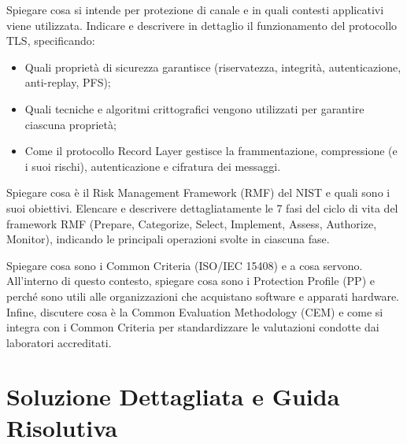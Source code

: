 \documentclass[11pt,a4paper]{article}
\begin{document}
\begin{questionbox}
Spiegare cosa si intende per protezione di canale e in quali contesti applicativi viene utilizzata.
Indicare e descrivere in dettaglio il funzionamento del protocollo TLS, specificando:
\begin{itemize}
    \item Quali propriet\`a di sicurezza garantisce (riservatezza, integrit\`a, autenticazione, anti-replay, PFS);
    \item Quali tecniche e algoritmi crittografici vengono utilizzati per garantire ciascuna propriet\`a;
    \item Come il protocollo Record Layer gestisce la frammentazione, compressione (e i suoi rischi), autenticazione e cifratura dei messaggi.
\end{itemize}
\end{questionbox}

\begin{questionbox}
Spiegare cosa \`e il Risk Management Framework (RMF) del NIST e quali sono i suoi obiettivi.
Elencare e descrivere dettagliatamente le 7 fasi del ciclo di vita del framework RMF (Prepare, Categorize, Select, Implement, Assess, Authorize, Monitor), indicando le principali operazioni svolte in ciascuna fase.
\end{questionbox}

\begin{questionbox}
Spiegare cosa sono i Common Criteria (ISO/IEC 15408) e a cosa servono.
All'interno di questo contesto, spiegare cosa sono i Protection Profile (PP) e perch\'e sono utili alle organizzazioni che acquistano software e apparati hardware.
Infine, discutere cosa \`e la Common Evaluation Methodology (CEM) e come si integra con i Common Criteria per standardizzare le valutazioni condotte dai laboratori accreditati.
\end{questionbox}

\newpage
\section{Soluzione Dettagliata e Guida Risolutiva}
\end{document}
